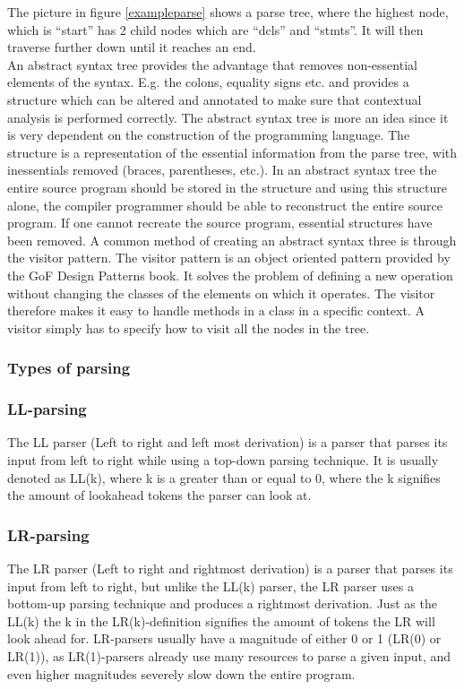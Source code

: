 The picture in figure \ref{exampleparse} shows a parse tree, where the highest node, which is “start” has 2 child nodes which are “dcls” and “stmts”. It will then traverse further down until it reaches an end. \\
An abstract syntax tree provides the advantage that removes non-essential elements of the syntax. E.g. the colons, equality signs etc. and provides a structure which can be altered and annotated to make sure that contextual analysis is performed correctly.
The abstract syntax tree is more an idea since it is very dependent on the construction of the programming language. The structure is a representation of the essential information from the parse tree, with inessentials removed (braces, parentheses, etc.). In an abstract syntax tree the entire source program should be stored in the structure and using this structure alone, the compiler programmer should be able to reconstruct the entire source program. If one cannot recreate the source program, essential structures have been removed.\cite{crafting-a-compiler}
A common method of creating an abstract syntax three is through the visitor pattern. The visitor pattern is an object oriented pattern provided by the GoF Design Patterns book.
It solves the problem of defining a new operation without changing the classes of the elements on which it operates.
The visitor therefore makes it easy to handle methods in a class in a specific context. A visitor simply has to specify how to visit all the nodes in the tree.
\subsubsection{Types of parsing}
\subsubsection*{LL-parsing}
The LL parser (Left to right and left most derivation) is a parser that parses its input from left to right while using a top-down parsing technique. It is usually denoted as LL(k), where k is a greater than or equal to 0, where the k signifies the amount of lookahead tokens the parser can look at\cite{conceptsOfProgrammingLanguages}.

\subsubsection*{LR-parsing}
The LR parser (Left to right and rightmost derivation) is a parser that parses its input from left to right, but unlike the LL(k) parser, the LR parser uses a bottom-up parsing technique and produces a rightmost derivation. Just as the LL(k) the k in the LR(k)-definition signifies the amount of tokens the LR will look ahead for\cite{conceptsOfProgrammingLanguages}. LR-parsers usually have a magnitude of either 0 or 1 (LR(0) or LR(1)), as LR(1)-parsers already use many resources to parse a given input, and even higher magnitudes severely slow down the entire program.

